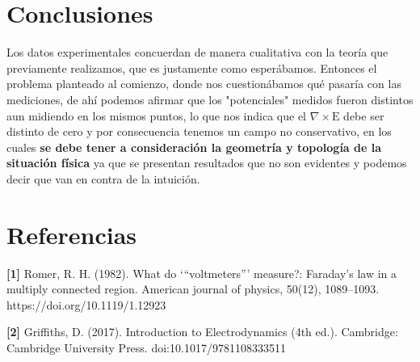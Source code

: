 \documentclass[a0,portrait]{a0poster}
\begin{document}
\begin{multicols}{2}

\color{Black} %

\section*{Conclusiones}

\noindent Los datos experimentales concuerdan de manera cualitativa con la teoría que previamente realizamos, que es justamente como esperábamos. Entonces el problema planteado al comienzo, donde nos cuestionábamos qué pasaría con las mediciones, de ahí podemos afirmar que los "potenciales" medidos  fueron distintos aun midiendo en los mismos puntos, lo que nos indica que el  $\nabla \times \text{E}$ debe ser distinto de cero y por consecuencia tenemos un campo no conservativo, en los cuales  \textbf{ se debe tener a consideración la geometría y topología de la situación física} ya que se presentan resultados que no son evidentes y podemos decir que van en contra de la intuición.

\color{Black} %


\section*{Referencias}

\textbf{[1]}
Romer, R. H. (1982). What do ‘“voltmeters”’ measure?: Faraday’s law in a multiply connected region. American journal of physics, 50(12), 1089–1093. https://doi.org/10.1119/1.12923
\vspace{0.4cm}

\textbf{[2]} Griffiths, D. (2017). Introduction to Electrodynamics (4th ed.). Cambridge: Cambridge University Press. doi:10.1017/9781108333511


\end{multicols}
\end{document}
